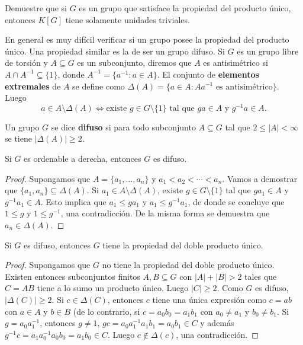 \begin{exercise}
	Demuestre que si $G$ es un grupo que satisface la propiedad del producto
	único, entonces $K[G]$ tiene solamente unidades triviales.
\end{exercise}

En general es muy difícil verificar si un grupo posee la propiedad del producto
único. Una propiedad similar es la de ser un grupo difuso. Si $G$ es un grupo
libre de torsión y $A\subseteq G$ es un subconjunto, diremos que $A$ es
antisimétrico si $A\cap A^{-1}\subseteq\{1\}$, donde $A^{-1}=\{a^{-1}:a\in
A\}$. El conjunto de \textbf{elementos extremales} de $A$ se define como
$\Delta(A)=\{a\in A:Aa^{-1}\text{ es antisimétrico}\}$. Luego
\[
	a\in A\setminus\Delta(A)
	\Longleftrightarrow
	\text{existe $g\in G\setminus\{1\}$ tal que $ga\in A$ y $g^{-1}a\in A$}.
\]

\begin{definition}
	Un grupo $G$ se dice \textbf{difuso} si para todo subconjunto $A\subseteq
	G$ tal que $2\leq |A|<\infty$ se tiene $|\Delta(A)|\geq2$.
\end{definition}

\begin{lemma}
	Si $G$ es ordenable a derecha, entonces $G$ es difuso.	
\end{lemma}

\begin{proof}
	Supongamos que $A=\{a_1,\dots,a_n\}$ y $a_1<a_2<\cdots<a_n$. Vamos a
	demostrar que $\{a_1,a_n\}\subseteq\Delta(A)$. Si $a_1\in
	A\setminus\Delta(A)$, existe $g\in G\setminus\{1\}$ tal que $ga_1\in A$ y
	$g^{-1}a_1\in A$. Esto implica que $a_1\leq ga_1$ y $a_1\leq g^{-1}a_1$, de
	donde se concluye que $1\leq g$ y $1\leq g^{-1}$, una contradicción. De la
	misma forma se demuestra que $a_n\in \Delta(A)$.
\end{proof}

\begin{lemma}
	\label{lemma:difuso=>2up}
	Si $G$ es difuso, entonces $G$ tiene la propiedad del doble producto único.	
\end{lemma}

\begin{proof}
	Supongamos que $G$ no tiene la propiedad del doble producto único. Existen
	entonces subconjuntos finitos $A,B\subseteq G$ con $|A|+|B|>2$ tales que
	$C=AB$ tiene a lo sumo un producto único. Luego $|C|\geq2$. Como $G$ es
	difuso, $|\Delta(C)|\geq2$. Si $c\in\Delta(C)$, entonces $c$ tiene una
	única expresión como $c=ab$ con $a\in A$ y $b\in B$ (de lo contrario, si
	$c=a_0b_0=a_1b_1$ con $a_0\ne a_1$ y $b_0\ne b_1$. Si $g=a_0a_1^{-1}$,
	entonces $g\ne 1$, $gc=a_0a_1^{-1}a_1b_1=a_0b_1\in C$ y además
	$g^{-1}c=a_1a_0^{-1}a_0b_0=a_1b_0\in C$. Luego $c\not\in\Delta(c)$, una
	contradicción.
\end{proof}



